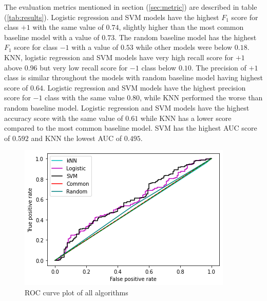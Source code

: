 \documentclass[transmag]{IEEEtran}
\begin{document}
\noindent The evaluation metrics mentioned in section (\ref{sec:metric}) are described in table (\ref{tab:results}). Logistic regression and SVM models have the highest $F_1$ score for class $+1$ with the same value of $0.74$, slightly higher than the most common baseline model with a value of $0.73$. The random baseline model has the highest $F_1$ score for class $-1$ with a value of $0.53$ while other models were below $0.18$. KNN, logistic regression and SVM models have very high recall score for $+1$ above $0.96$ but very low recall score for $-1$ class below $0.10$. The precision of $+1$ class is similar throughout the models with random baseline model having highest score of $0.64$. Logistic regression and SVM models have the highest precision score for $-1$ class with the same value $0.80$, while KNN performed the worse than random baseline model. Logistic regression and SVM models have the highest accuracy score with the same value of $0.61$ while KNN has a lower score compared to the most common baseline model. SVM has the highest AUC score of $0.592$ and KNN the lowest AUC of $0.495$.

\begin{figure}[h]
	\includegraphics[width=\columnwidth]{roc_curve.png} 
    \caption{ROC curve plot of all algorithms}%
    \label{fig:results_roc}%
\end{figure}
\end{document}
